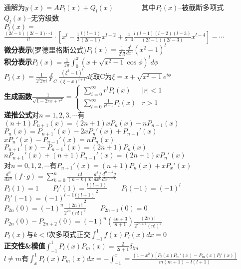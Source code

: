 \documentclass[10pt,a4paper]{article}
\begin{document}
\begin{multicols}{2}
通解为$y(x)=AP_l(x)+Q_l(x)$~~~~~~~~其中$P_l(x)$--被截断多项式~~~~~~~~$Q_l(x)$--无穷级数\\
$P_l(x)=$\\
\indent$\frac{(2l-1)(2l-3)\cdots1}{l!}\cdot[x^l-\frac{1}{2}\frac{l(l-1)}{(2l-1)}x^{l-2}+\frac{1}{2\cdot4}\frac{l(l-1)(l-2)(l-3)}{(2l-1)(2l-3)}x^{l-4}]-\cdots$\\
\textbf{微分表示}(罗德里格斯公式)$P_l(x)=\frac{1}{2^ll!}\frac{d^l}{dx^l}(x^2-1)^l$\\
\textbf{积分表示}$P_l(x)=\frac{1}{2\pi}\int_0^{\pi}(x+\sqrt{x^2-1}\cos\phi)^ld\phi$\\
$P_l(x)=\frac{1}{2^l2\pi i}\oint_C\frac{(\xi^2-1)^l}{(\xi-x)^{l+1}}d\xi$取C为$\xi=x+\sqrt{x^2-1}e^{i\phi}$\\
\textbf{生成函数}$\frac{1}{\sqrt{1-2rx+r^2}}=\left\{\begin{array}{ll}\sum_{i=0}^{\infty}r^lP_l(x)&|r|<1\\\sum_{l=0}^{\infty}\frac{1}{r^{l+1}}P_l(x)&r>1\end{array}\right.$\\
\textbf{递推公式}对$n=1,2,3,\cdots$有$(n+1)P_{n+1}(x)=(2n+1)xP_n(x)-nP_{n-1}(x)$\\
\indent\indent$P_n(x)=P_{n+1}'(x)-2xP_n'(x)+P_{n-1}'(x)$\\
\indent\indent$xP_n'(x)-P_{n-1}'(x)=nP_n(x)$\\
\indent\indent$P_{n+1}'(x)-P_{n-1}'(x)=(2n+1)P_n(x)$\\
\indent\indent$nP_{n+1}'(x)+(n+1)P_{n-1}'(x)=(2n+1)xP_n'(x)$\\
\indent\indent 对$n=0,1,2,\cdots$有$P_{n+1}'(x)=(n+1)P_n(x)+xP_x'(x)$\\
$\frac{d^n}{dx^n}(f\cdot g)=\sum_{k=0}^n\frac{n!}{(n-k)!k!}\frac{d^kf}{dx^k}\frac{d^{n-k}g}{dx^{n-k}}$\\
\indent$P_l(1)=1$~~~~$P_l'(1)=\frac{l(l+1)}{2}$~~~~$P_l(-1)=(-1)^l$~~~~$P_l'(-1)=(-1)^{l-1}\frac{l(l+1)}{2}$\\
\indent$P_{2n}(0)=(-1)^n\frac{(2n)!}{2^{2n}(n!)^2}$~~~~$P_{2n+1}(0)=0$\\
\indent$P_{2n}(0)-P_{2n+2}(0)=(-1)^n(\frac{4n+3}{n+1})\frac{(2n)!}{2^{2n+1}(n!)^2}$\\
\indent$P_l(x)$与$k<l$次多项式正交$\int_{-1}^1f(x)P_l(x)dx=0$\\
\textbf{正交性\&模值}$\int_{-1}^1P_l(x)P_m(x)=\frac{2}{2l+1}\delta_{lm}$\\
\indent{}$l\neq m$有$\int_x^1P_l(x)P_m(x)dx=-\int_{-1}^x=\frac{(1-x^2)[P_l(x)P_m'(x)-P_m(x)P_l'(x)]}{m(m+1)-l(l+1)}$\\

\end{multicols}
\end{document}
